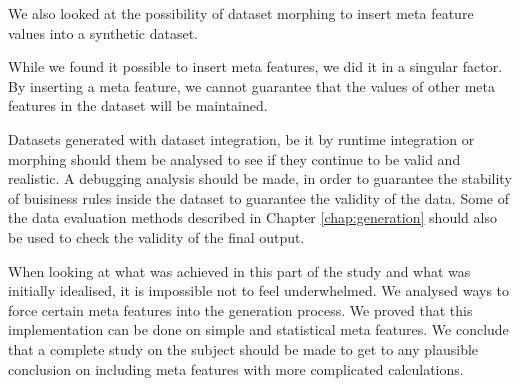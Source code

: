 We also looked at the possibility of dataset morphing to insert meta feature values into a synthetic dataset.

While we found it possible to insert meta features, we did it in a singular factor. By inserting a meta feature, we cannot guarantee that the values of other meta features in the dataset will be maintained.

Datasets generated with dataset integration, be it by runtime integration or morphing should them be analysed to see if they continue to be valid and realistic. A debugging analysis should be made, in order to guarantee the stability of buisiness rules inside the dataset to guarantee the validity of the data. Some of the data evaluation methods described in Chapter \ref{chap:generation} should also be used to check the validity of the final output.

When looking at what was achieved in this part of the study and what was initially idealised, it is impossible not to feel underwhelmed. We analysed ways to force certain meta features into the generation process. We proved that this implementation can be done on simple and statistical meta features. We conclude that a complete study on the subject should be made to get to any plausible conclusion on including meta features with more complicated calculations.
